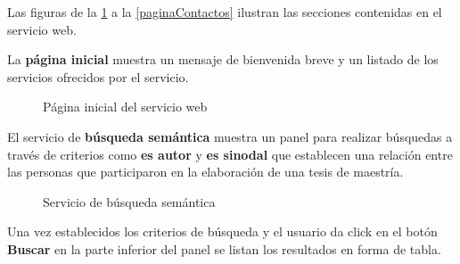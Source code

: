 Las figuras de la \ref{paginaInicial} a la \ref{paginaContactos} ilustran las secciones contenidas en el servicio web.\newline

La \textbf{p\'agina inicial} muestra un mensaje de bienvenida breve y un listado de los servicios ofrecidos por el servicio.\newline

\begin{figure}[!ht]
	\centering
    \caption{P\'agina inicial del servicio web}
    \label{paginaInicial}
\end{figure}

El servicio de \textbf{b\'usqueda sem\'antica} muestra un panel para realizar b\'usquedas a trav\'es de criterios como \textbf{es autor} y \textbf{es sinodal} que establecen una relaci\'on entre las personas que participaron en la elaboraci\'on de una tesis de maestr\'ia.\newline

\begin{figure}[!ht]
	\centering
    \caption{Servicio de b\'usqueda sem\'antica}
    \label{paginaSemantica}
\end{figure}

Una vez establecidos los criterios de b\'usqueda y el usuario da click en el bot\'on \textbf{Buscar} en la parte inferior del panel se listan los resultados en forma de tabla.\newline


